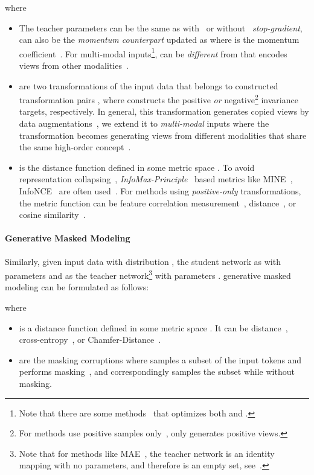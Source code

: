 \documentclass{article}
\theoremstyle{plain}
\theoremstyle{definition}
\theoremstyle{remark}
\begin{document}
where
\begin{itemize}
    \item The teacher parameters  can be the same as  with~\citep{SimSiam} or without~\citep{SimCLR} \textit{stop-gradient},  can also be the \textit{momentum counterpart} updated as  where  is the momentum coefficient~\citep{MoCo,MoCoThree21}. For multi-modal inputs\footnote{Note that there are some methods~\citep{CMC20,CLIP} that optimizes both  and .},  can be \textit{different} from  that encodes views from other modalities~\citep{CMC20,CLIP,CenterLoss21}.
    \item  are two transformations of the input data that belongs to constructed transformation pairs , where  constructs the positive \textit{or} negative\footnote{For methods use positive samples only~\citep{BYOL,SimSiam},  only generates positive views.} invariance targets, respectively.
    In general, this transformation generates copied views by data augmentations~\citep{DINO21,StrongAugContrast21}, we extend it to \textit{multi-modal} inputs where the transformation becomes generating views from different modalities that share the same high-order concept~\citep{CLIP,TupleInfoNCE21}.
    \item  is the distance function defined in some metric space .
    To avoid representation collapsing~\citep{MoCo}, \textit{InfoMax-Principle}~\citep{DeepInfoMax19,AugDeepInfoMax19} based metrics like MINE~\citep{MINE18}, InfoNCE~\citep{InfoNCE} are often used~\citep{MoCo,GoodViewContrast20,CDS22}. For methods using \textit{positive-only} transformations, the metric function can be feature correlation measurement~\citep{BarlowTwins21},  distance~\citep{WhiteContrast21}, or cosine similarity~\citep{BYOL,SimSiam}.
\end{itemize}
\paragraph{Generative Masked Modeling} Similarly, given input data  with distribution , the student network as  with parameters  and  as the teacher network\footnote{Note that for methods like MAE~\citep{MAE,PointMAE}, the teacher network is an identity mapping with no parameters, and therefore  is an empty set, see~\citet{ACT23}.} with parameters . 
generative masked modeling can be formulated as follows:

where 
\begin{itemize}
    \item  is a distance function defined in some metric space . It can be  distance~\citep{MAE}, cross-entropy~\citep{BERT,BEiT}, or Chamfer-Distance~\citep{ChamferDistance17,PointMAE}.
    \item  are the masking corruptions where  samples a subset of the input tokens and performs masking~\citep{BERT}, and  correspondingly samples the subset while without masking.
\end{itemize}
\end{document}
